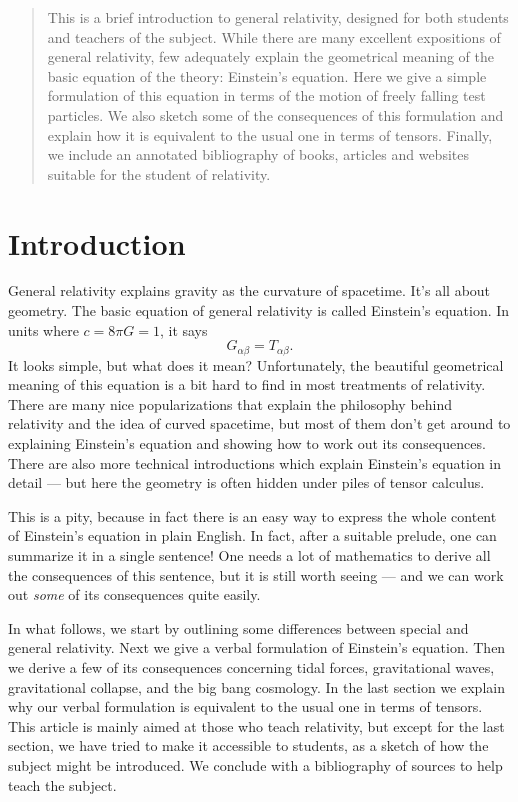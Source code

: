 \begin{abstract}
\noindent
This is a brief introduction to general relativity, designed for both
students and teachers of the subject.  While there are many excellent
expositions of general relativity, few adequately explain the
geometrical meaning of the basic equation of the theory: Einstein's
equation.  Here we give a simple formulation of this equation in terms
of the motion of freely falling test particles.  We also sketch some
of the consequences of this formulation and explain how it is
equivalent to the usual one in terms of tensors.  Finally, we include
an annotated bibliography of books, articles and websites suitable for
the student of relativity.

\end{abstract}

\section{Introduction}

General relativity explains gravity as the curvature of
spacetime.  It's all about geometry.  The basic equation
of general relativity is called Einstein's equation.   In units
where $c = 8 \pi G = 1$, it says
\begin{equation}
         G_{\alpha \beta} = T_{\alpha \beta} . 
\label{usualeinstein}\end{equation}
It looks simple, but what does it mean?   Unfortunately, the beautiful
geometrical meaning of this equation is a bit hard to find in most
treatments of relativity.  There are many nice popularizations that
explain the philosophy behind relativity and the idea of curved
spacetime, but most of them don't get around to explaining Einstein's
equation and showing how to work out its consequences.   There are
also more technical introductions which explain Einstein's equation in
detail --- but here the geometry is often hidden under piles of tensor 
calculus.

This is a pity, because in fact there is an easy way to express the
whole content of Einstein's equation in plain English.  In fact, after
a suitable prelude, one can summarize it in a single sentence!  One
needs a lot of mathematics to derive all the consequences of this
sentence, but it is still worth seeing --- and we can work out {\it
some} of its consequences quite easily.

In what follows, we start by outlining some differences between
special and general relativity.  Next we give a verbal formulation of
Einstein's equation.  Then we derive a few of its consequences
concerning tidal forces, gravitational waves, gravitational collapse,
and the big bang cosmology.  In the last section we explain why our
verbal formulation is equivalent to the usual one in terms of
tensors.  This article is mainly aimed at those who teach relativity,
but except for the last section, we have tried to make it accessible
to students, as a sketch of how the subject might be introduced.  We
conclude with a bibliography of sources to help teach the subject.

